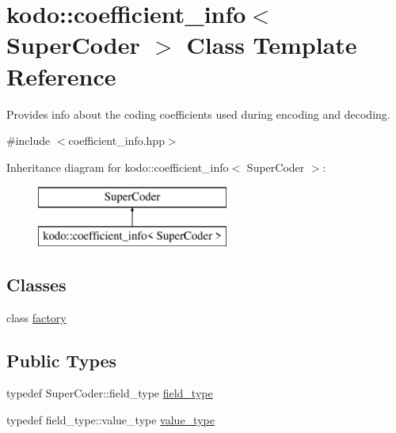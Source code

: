 \hypertarget{classkodo_1_1coefficient__info}{\section{kodo\-:\-:coefficient\-\_\-info$<$ Super\-Coder $>$ Class Template Reference}
\label{classkodo_1_1coefficient__info}
}


Provides info about the coding coefficients used during encoding and decoding.  




{\ttfamily \#include $<$coefficient\-\_\-info.\-hpp$>$}

Inheritance diagram for kodo\-:\-:coefficient\-\_\-info$<$ Super\-Coder $>$\-:\begin{figure}[H]
\begin{center}
\leavevmode
\includegraphics[height=2.000000cm]{classkodo_1_1coefficient__info}
\end{center}
\end{figure}
\subsection*{Classes}
\begin{DoxyCompactItemize}
\item 
class \hyperlink{classkodo_1_1coefficient__info_1_1factory}{factory}
\end{DoxyCompactItemize}
\subsection*{Public Types}
\begin{DoxyCompactItemize}
\item 
typedef Super\-Coder\-::field\-\_\-type \hyperlink{classkodo_1_1coefficient__info_a99c7ca3d45844ae0ea385e26ab89e7e2}{field\-\_\-type}
\begin{DoxyCompactList}\small\item\em \end{DoxyCompactList}\item 
typedef field\-\_\-type\-::value\-\_\-type \hyperlink{classkodo_1_1coefficient__info_aad4c09d64c58a0469b87aff5ee7c1607}{value\-\_\-type}
\begin{DoxyCompactList}\small\item\em \end{DoxyCompactList}\end{DoxyCompactItemize}
